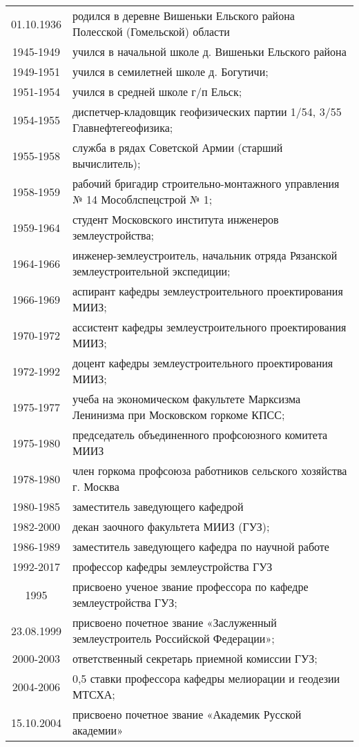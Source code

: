 \begin{table}
	\begin{tabular}{cl}
		01.10.1936		&	родился в деревне Вишеньки Ельского района Полесской (Гомельской) области			\\
		1945-1949		&	учился в начальной школе д. Вишеньки Ельского района								\\
		1949-1951		&	учился в семилетней школе д. Богутичи;												\\
		1951-1954		&	учился в средней школе г/п Ельск;													\\
		1954-1955		&	диспетчер-кладовщик геофизических партии 1/54, 3/55 Главнефтегеофизика;				\\
		1955-1958		&	служба в рядах Советской Армии (старший вычислитель);								\\
		1958-1959		&	рабочий бригадир строительно-монтажного управления № 14 Мособлспецстрой № 1;		\\
		1959-1964		&	студент Московского института инженеров землеустройства;							\\
		1964-1966		&	инженер-землеустроитель, начальник отряда  Рязанской землеустроительной экспедиции;	\\
		1966-1969		&	аспирант кафедры землеустроительного проектирования МИИЗ;							\\
		1970-1972		&	ассистент кафедры землеустроительного проектирования МИИЗ;							\\
		1972-1992		&	доцент кафедры землеустроительного проектирования МИИЗ;								\\
		1975-1977		&	учеба на экономическом факультете Марксизма Ленинизма при Московском горкоме КПСС;	\\
		1975-1980		&	председатель объединенного профсоюзного комитета МИИЗ								\\
		1978-1980		&	член горкома профсоюза работников сельского хозяйства г. Москва						\\
		1980-1985		&	заместитель заведующего кафедрой													\\
		1982-2000		&	декан заочного факультета МИИЗ (ГУЗ);												\\
		1986-1989		&	заместитель заведующего кафедра по научной работе									\\
		1992-2017		&	профессор кафедры землеустройства ГУЗ												\\
		1995				&	присвоено ученое звание профессора по кафедре землеустройства ГУЗ;					\\
		23.08.1999	&	присвоено почетное звание «Заслуженный землеустроитель Российской Федерации»;		\\
		2000-2003		&	ответственный секретарь приемной комиссии ГУЗ;										\\
		2004-2006		&	0,5 ставки профессора кафедры мелиорации и геодезии МТСХА;							\\

		15.10.2004	&	присвоено почетное звание «Академик Русской академии»									\\
	\end{tabular}
\end{table}
 